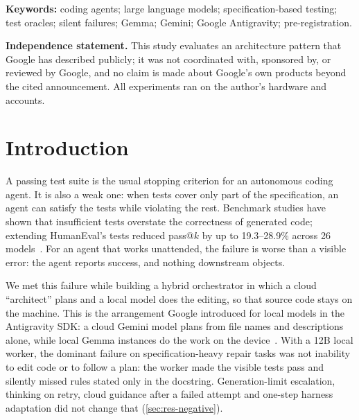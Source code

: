 \documentclass[11pt]{article}
\begin{document}
\noindent\textbf{Keywords:} coding agents; large language models; specification-based testing; test oracles; silent failures; Gemma; Gemini; Google Antigravity; pre-registration.

\medskip
\noindent\textbf{Independence statement.} This study evaluates an architecture pattern that Google has described publicly; it was not coordinated with, sponsored by, or reviewed by Google, and no claim is made about Google's own products beyond the cited announcement. All experiments ran on the author's hardware and accounts.

\section{Introduction}\label{sec:intro}
A passing test suite is the usual stopping criterion for an autonomous coding agent. It is also a weak one: when tests cover only part of the specification, an agent can satisfy the tests while violating the rest. Benchmark studies have shown that insufficient tests overstate the correctness of generated code; extending HumanEval's tests reduced pass@$k$ by up to 19.3--28.9\% across 26 models~\citep{liu2023evalplus}. For an agent that works unattended, the failure is worse than a visible error: the agent reports success, and nothing downstream objects.

We met this failure while building a hybrid orchestrator in which a cloud ``architect'' plans and a local model does the editing, so that source code stays on the machine. This is the arrangement Google introduced for local models in the Antigravity SDK: a cloud Gemini model plans from file names and descriptions alone, while local Gemma instances do the work on the device~\citep{kotwani2026antigravity}. With a 12B local worker, the dominant failure on specification-heavy repair tasks was not inability to edit code or to follow a plan: the worker made the visible tests pass and silently missed rules stated only in the docstring. Generation-limit escalation, thinking on retry, cloud guidance after a failed attempt and one-step harness adaptation did not change that (\cref{sec:res-negative}).
\end{document}
